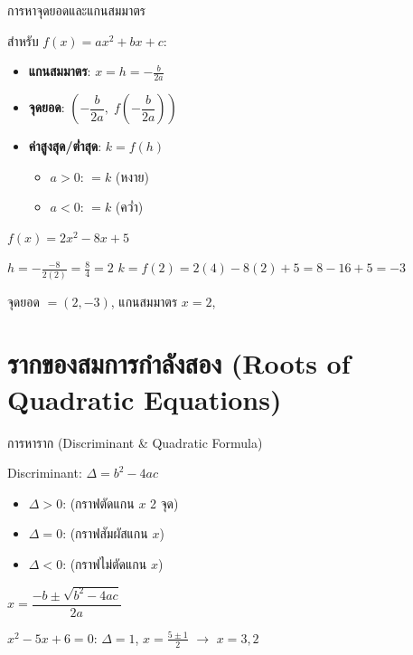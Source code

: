 \documentclass[11pt, aspectratio=169]{beamer}
\begin{document}
\begin{frame}{การหาจุดยอดและแกนสมมาตร}
  \begin{explanation}[สูตร]
    สำหรับ $f(x) = ax^2 + bx + c$:
    \begin{itemize}
      \item \textbf{แกนสมมาตร}: $x = h = -\frac{b}{2a}$
      \item \textbf{จุดยอด}: $\left(-\dfrac{b}{2a},\; f\!\left(-\dfrac{b}{2a}\right)\right)$
      \item \textbf{ค่าสูงสุด/ตํ่าสุด}: $k = f(h)$
      \begin{itemize}
        \item $a > 0$:  $= k$ (หงาย)
        \item $a < 0$:  $= k$ (ควํ่า)
      \end{itemize}
    \end{itemize}
  \end{explanation}

  \begin{exambox}
    $f(x) = 2x^2 - 8x + 5$

    $h = -\frac{-8}{2(2)} = \frac{8}{4} = 2$ \qquad $k = f(2) = 2(4) - 8(2) + 5 = 8 - 16 + 5 = -3$

    จุดยอด $= (2, -3)$, แกนสมมาตร $x = 2$, 
  \end{exambox}
\end{frame}

\section{รากของสมการกำลังสอง (Roots of Quadratic Equations)}

\begin{frame}{การหาราก (Discriminant \& Quadratic Formula)}
  \begin{explanation}[Discriminant]
    Discriminant: $\Delta = b^2 - 4ac$
    \begin{itemize}
      \item $\Delta > 0$:  (กราฟตัดแกน $x$ 2 จุด)
      \item $\Delta = 0$:  (กราฟสัมผัสแกน $x$)
      \item $\Delta < 0$:  (กราฟไม่ตัดแกน $x$)
    \end{itemize}
  \end{explanation}

  \begin{exambox}
    $x = \dfrac{-b \pm \sqrt{b^2 - 4ac}}{2a}$

    $x^2 - 5x + 6 = 0$: \; $\Delta = 1$, \; $x = \frac{5 \pm 1}{2}$ \; $\rightarrow$ \; $x = 3, 2$
  \end{exambox}
\end{frame}
\end{document}

